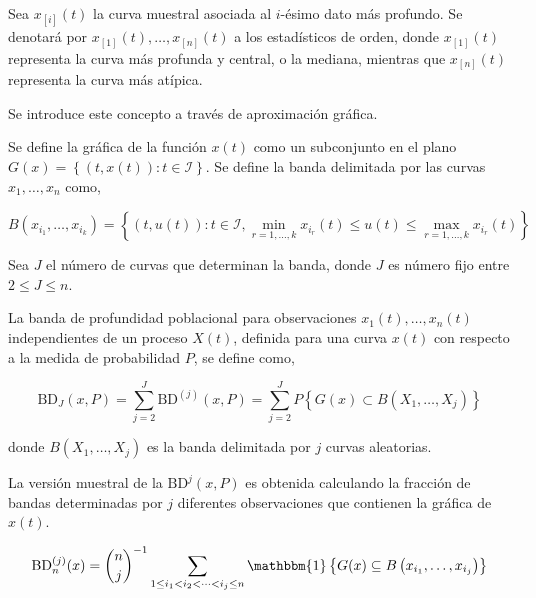 Sea $x_{[i]}(t)$ la curva muestral asociada al $i$-ésimo dato más profundo. Se denotará por $x_{[1]}(t), \dots, x_{[n]}(t)$ a los estadísticos de orden, donde $x_{[1]}(t)$ representa la curva más profunda y central, o la mediana, mientras que $x_{[n]}(t)$ representa la curva más atípica.

Se introduce este concepto a través de aproximación gráfica.

\begin{defn}[Banda]
    Se define la gráfica de la función $x(t)$ como un subconjunto en el plano $G(x) =  \left\{ (t, x(t)): t \in \mathcal{I} \right\}$. Se define la banda delimitada por las curvas $x_1, \dots, x_n$ como,
    
    \begin{equation}
        B\left(x_{i_1}, \ldots, x_{i_k}\right)=\left\{(t, u(t)): t \in \mathcal{I}, \min_{r=1, \ldots, k} x_{i_r}(t) \leq u(t) \leq \max _{r=1, \ldots, k} x_{i_r}(t)\right\}
    \end{equation}
\end{defn}

\begin{defn}
    Sea $J$ el número de curvas que determinan la banda, donde $J$ es número fijo entre $2 \leq J \leq n$.

    La banda de profundidad poblacional para observaciones $x_1(t), \dots, x_n(t)$ independientes de un proceso $X(t)$, definida para una curva $x(t)$ con respecto a la medida de probabilidad $P$, se define como,

    \begin{equation}
        \mathrm{BD}_J(x, P)=\sum_{j=2}^J \mathrm{BD}^{(j)}(x, P)=\sum_{j=2}^J P\left\{G(x) \subset B\left(X_1, \ldots, X_j\right)\right\}
    \end{equation}

    donde $B(X_1, \dots, X_j)$ es la banda delimitada por $j$ curvas aleatorias.
\end{defn}

La versión muestral de la $\mathrm{BD}^{j}(x, P)$ es obtenida calculando la fracción de bandas determinadas por $j$ diferentes observaciones que contienen la gráfica de $x(t)$.

\begin{equation}
    \mathrm{BD}_n^{(j)}(x)= \binom{n}{j}^{-1} \sum_{1 \leq i_1<i_2<\cdots<i_j \leq n} \mathbbm{1}\left\{G(x) \subseteq B\left(x_{i_1}, \ldots, x_{i_j}\right)\right\}
\end{equation}

